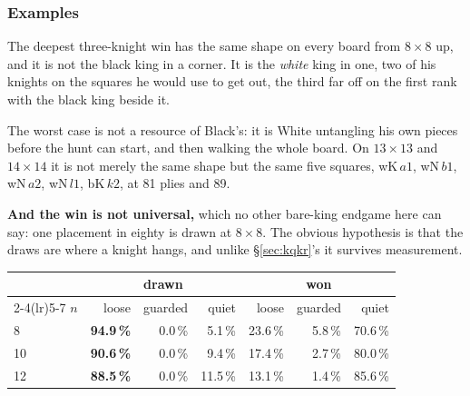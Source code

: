 \documentclass[10pt]{article}
\begin{document}
\subsubsection{Examples}\label{sub:kn-hardest}

\noindent
The deepest three-knight win has the same shape on every board from $8\times8$
up, and it is not the black king in a corner. It is the \emph{white} king in
one, two of his knights on the squares he would use to get out, the third far
off on the first rank with the black king beside it.

\medskip
\noindent
{}\hfill
{}\hfill
{}

\medskip
\noindent
The worst case is not a resource of Black's: it is White untangling his own
pieces before the hunt can start, and then walking the whole board. On
$13\times13$ and $14\times14$ it is not merely the same shape but the same five
squares, wK\,$a1$, wN\,$b1$, wN\,$a2$, wN\,$l1$, bK\,$k2$, at 81 plies and 89.

\medskip
\noindent
\textbf{And the win is not universal,} which no other bare-king endgame here
can say: one placement in eighty is drawn at $8\times8$. The obvious hypothesis
is that the draws are where a knight hangs, and unlike \S\ref{sec:kqkr}'s it
survives measurement.

\begin{center}\small
\begin{tabular}{@{}lrrrrrr@{}}
\toprule
& \multicolumn{3}{c}{\textbf{drawn}} & \multicolumn{3}{c}{\textbf{won}} \\
\cmidrule(lr){2-4}\cmidrule(lr){5-7}
$n$ & loose & guarded & quiet & loose & guarded & quiet \\
\midrule
 8 & \textbf{94.9\,\%} & 0.0\,\% &  5.1\,\% & 23.6\,\% & 5.8\,\% & 70.6\,\% \\
10 & \textbf{90.6\,\%} & 0.0\,\% &  9.4\,\% & 17.4\,\% & 2.7\,\% & 80.0\,\% \\
12 & \textbf{88.5\,\%} & 0.0\,\% & 11.5\,\% & 13.1\,\% & 1.4\,\% & 85.6\,\% \\
\bottomrule
\end{tabular}
\end{center}
\end{document}
